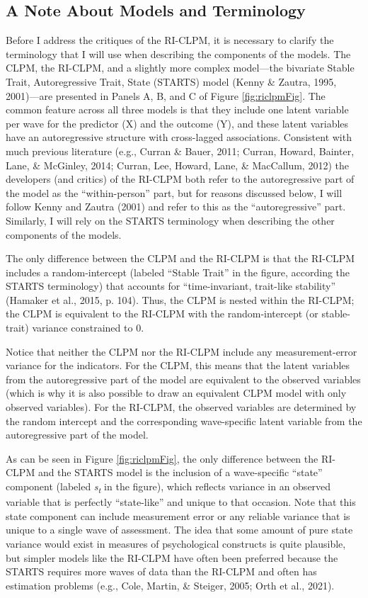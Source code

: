 \documentclass[
  english,
  man,floatsintext]{apa6}
\begin{document}
\hypertarget{a-note-about-models-and-terminology}{%
\subsection{A Note About Models and Terminology}\label{a-note-about-models-and-terminology}}

Before I address the critiques of the RI-CLPM, it is necessary to clarify the terminology that I will use when describing the components of the models. The CLPM, the RI-CLPM, and a slightly more complex model---the bivariate Stable Trait, Autoregressive Trait, State (STARTS) model (Kenny \& Zautra, 1995, 2001)---are presented in Panels A, B, and C of Figure \ref{fig:riclpmFig}. The common feature across all three models is that they include one latent variable per wave for the predictor (X) and the outcome (Y), and these latent variables have an autoregressive structure with cross-lagged associations. Consistent with much previous literature (e.g., Curran \& Bauer, 2011; Curran, Howard, Bainter, Lane, \& McGinley, 2014; Curran, Lee, Howard, Lane, \& MacCallum, 2012) the developers (and critics) of the RI-CLPM both refer to the autoregressive part of the model as the ``within-person'' part, but for reasons discussed below, I will follow Kenny and Zautra (2001) and refer to this as the ``autoregressive'' part. Similarly, I will rely on the STARTS terminology when describing the other components of the models.

The only difference between the CLPM and the RI-CLPM is that the RI-CLPM includes a random-intercept (labeled ``Stable Trait'' in the figure, according the STARTS terminology) that accounts for ``time-invariant, trait-like stability'' (Hamaker et al., 2015, p. 104). Thus, the CLPM is nested within the RI-CLPM; the CLPM is equivalent to the RI-CLPM with the random-intercept (or stable-trait) variance constrained to 0.

Notice that neither the CLPM nor the RI-CLPM include any measurement-error variance for the indicators. For the CLPM, this means that the latent variables from the autoregressive part of the model are equivalent to the observed variables (which is why it is also possible to draw an equivalent CLPM model with only observed variables). For the RI-CLPM, the observed variables are determined by the random intercept and the corresponding wave-specific latent variable from the autoregressive part of the model.

As can be seen in Figure \ref{fig:riclpmFig}, the only difference between the RI-CLPM and the STARTS model is the inclusion of a wave-specific ``state'' component (labeled \emph{s\textsubscript{t}} in the figure), which reflects variance in an observed variable that is perfectly ``state-like'' and unique to that occasion. Note that this state component can include measurement error or any reliable variance that is unique to a single wave of assessment. The idea that some amount of pure state variance would exist in measures of psychological constructs is quite plausible, but simpler models like the RI-CLPM have often been preferred because the STARTS requires more waves of data than the RI-CLPM and often has estimation problems (e.g., Cole, Martin, \& Steiger, 2005; Orth et al., 2021).
\end{document}
